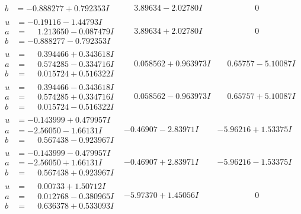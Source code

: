 \documentclass[1p]{elsarticle_modified}
\theoremstyle{definition}
\begin{document}
$$\begin{array}{c|c|c}
\begin{aligned}
b &= -0.888277 + 0.792353 I\end{aligned}
 & \phantom{-}3.89634 - 2.02780 I & \phantom{-0.000000 } 0 \\ \hline\begin{aligned}
u &= -0.19116 - 1.44793 I \\
a &= \phantom{-}1.213650 - 0.087479 I \\
b &= -0.888277 - 0.792353 I\end{aligned}
 & \phantom{-}3.89634 + 2.02780 I & \phantom{-0.000000 } 0 \\ \hline\begin{aligned}
u &= \phantom{-}0.394466 + 0.343618 I \\
a &= \phantom{-}0.574285 - 0.334716 I \\
b &= \phantom{-}0.015724 + 0.516322 I\end{aligned}
 & \phantom{-}0.058562 + 0.963973 I & \phantom{-}0.65757 - 5.10087 I \\ \hline\begin{aligned}
u &= \phantom{-}0.394466 - 0.343618 I \\
a &= \phantom{-}0.574285 + 0.334716 I \\
b &= \phantom{-}0.015724 - 0.516322 I\end{aligned}
 & \phantom{-}0.058562 - 0.963973 I & \phantom{-}0.65757 + 5.10087 I \\ \hline\begin{aligned}
u &= -0.143999 + 0.479957 I \\
a &= -2.56050 - 1.66131 I \\
b &= \phantom{-}0.567438 - 0.923967 I\end{aligned}
 & -0.46907 - 2.83971 I & -5.96216 + 1.53375 I \\ \hline\begin{aligned}
u &= -0.143999 - 0.479957 I \\
a &= -2.56050 + 1.66131 I \\
b &= \phantom{-}0.567438 + 0.923967 I\end{aligned}
 & -0.46907 + 2.83971 I & -5.96216 - 1.53375 I \\ \hline\begin{aligned}
u &= \phantom{-}0.00733 + 1.50712 I \\
a &= \phantom{-}0.012768 - 0.380965 I \\
b &= \phantom{-}0.636378 + 0.533093 I\end{aligned}
 & -5.97370 + 1.45056 I & \phantom{-0.000000 } 0 \\ \hline\begin{aligned}

\end{aligned}
\end{array}$$
\end{document}

